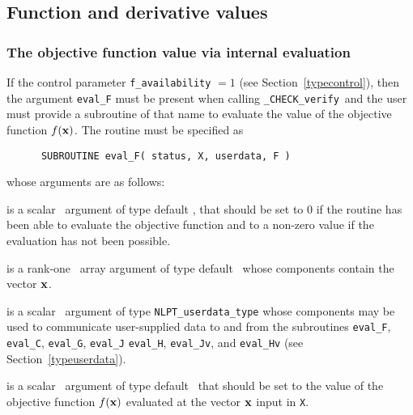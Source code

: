 \documentclass{galahad}
\newcommand{\packagename}{CHECK}
\newcommand{\fullpackagename}{\libraryname\_\packagename}
\newcommand{\solver}{{\tt \fullpackagename\_verify}}
\begin{document}

\subsection{Function and derivative values\label{fdv}}


\subsubsection{The objective function value via internal evaluation\label{ffv}}

If the control parameter {\tt f\_availability} $=1$ (see
Section~\ref{typecontrol}), then the argument
{\tt eval\_F} must be present when calling \solver\ and the
user must provide a subroutine of that name to evaluate the
value of the objective function $f({\mathbf{x}})$.
The routine must be specified as

\def\baselinestretch{0.8}
{\tt \begin{verbatim}
      SUBROUTINE eval_F( status, X, userdata, F ) \end{verbatim} }
\def\baselinestretch{1.0}
\noindent whose arguments are as follows:

\begin{description}
 is a scalar \intentout\ argument of type default \integer,
that should be set to 0 if the routine has been able to evaluate 
the objective function
and to a non-zero value if the evaluation has not been possible.

 is a rank-one \intentin\ array argument of type default \realdp\
whose components contain the vector ${\mathbf{x}}$.

 is a scalar \intentinout\ argument of type 
{\tt NLPT\_userdata\_type} whose components may be used
to communicate user-supplied data to and from the
subroutines {\tt eval\_F}, {\tt eval\_C}, {\tt eval\_G}, {\tt eval\_J}
{\tt eval\_H}, {\tt eval\_Jv}, and {\tt eval\_Hv} 
(see Section~\ref{typeuserdata}). 

 is a scalar \intentout\ argument of type default \realdp\
that should be set to the value of the objective function $f({\mathbf{x}})$
evaluated at the vector ${\mathbf{x}}$ input in {\tt X}.

\end{description}

\end{document}

